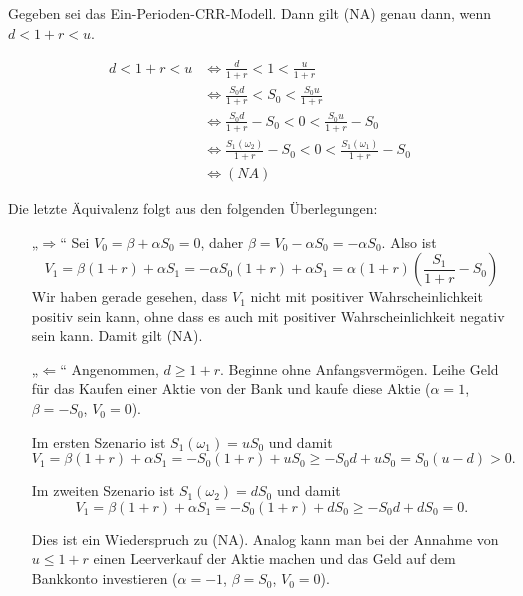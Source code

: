 \documentclass[a4paper,twoside,DIV15,BCOR12mm]{scrbook}
\begin{document}
\begin{lemma}
Gegeben sei das Ein-Perioden-CRR-Modell. Dann gilt (NA) genau dann, wenn $d< 1+ r < u$.
\end{lemma}
\begin{beweis}
\begin{align*}
d < 1+r < u &\iff \frac d{1+r} < 1 < \frac u{1+r} \\
&\iff \frac{S_0 d}{1+r} < S_0 < \frac{S_0 u}{1+r} \\
&\iff \frac{S_0 d}{1+r} - S_0 < 0 < \frac{S_0 u}{1+r} - S_0 \\
&\iff \frac{S_1(\omega_2)}{1+r} - S_0 < 0 < \frac{S_1(\omega_1)}{1+r} - S_0 \\
&\iff (NA)
\end{align*}

Die letzte Äquivalenz folgt aus den folgenden Überlegungen:
\begin{itemize}
\item[„$\Longrightarrow$“] Sei $V_0 = \beta + \alpha S_0 = 0$, daher $\beta = V_0- \alpha S_0 = -\alpha S_0$. Also ist 
\[
V_1=\beta(1+r) + \alpha S_1 = -\alpha S_0(1+r) + \alpha S_1 = \alpha (1+r)(\frac{S_1}{1+r} - S_0)
\]
Wir haben gerade gesehen, dass $V_1$ nicht mit positiver Wahrscheinlichkeit positiv sein kann, ohne dass es auch mit positiver Wahrscheinlichkeit negativ sein kann. Damit gilt (NA).
\item[„$\Longleftarrow$“] Angenommen, $d\ge 1+ r$. Beginne ohne Anfangsvermögen. Leihe Geld für das Kaufen einer Aktie von der Bank und kaufe diese Aktie ($\alpha = 1$, $\beta = -S_0$, $V_0=0$). 

Im ersten Szenario ist $S_1(\omega_1) = uS_0$ und damit
\[V_1=\beta(1+r) + \alpha S_1 = -S_0(1+r) + u S_0 \ge - S_0d + uS_0 = S_0(u-d) > 0.\]

Im zweiten Szenario ist $S_1(\omega_2) = dS_0$ und damit 
\[V_1=\beta(1+r) + \alpha S_1 = -S_0(1+r) + d S_0 \ge - S_0d + dS_0 = 0.\]

Dies ist ein Wiederspruch zu (NA). Analog kann man bei der Annahme von $u\le 1+r$ einen Leerverkauf der Aktie machen und das Geld auf dem Bankkonto investieren ($\alpha = -1$, $\beta = S_0$, $V_0=0$).
\end{itemize}
\end{beweis}
\end{document}
